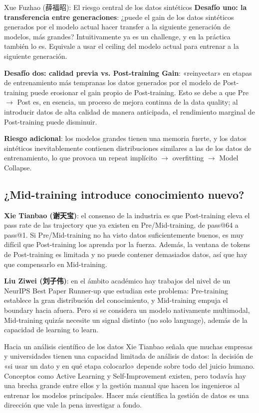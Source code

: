 \documentclass[a4paper]{article}
\begin{document}
\begin{warningbox}{Xue Fuzhao (薛福昭): El riesgo central de los datos sintéticos}
\textbf{Desafío uno: la transferencia entre generaciones}: ¿puede el gain de los datos sintéticos generados por el modelo actual hacer transfer a la siguiente generación de modelos, más grandes? Intuitivamente ya es un challenge, y en la práctica también lo es. Equivale a usar el ceiling del modelo actual para entrenar a la siguiente generación.

\textbf{Desafío dos: calidad previa vs. Post-training Gain}: «reinyectar» en etapas de entrenamiento más tempranas los datos generados por el modelo de Post-training puede erosionar el gain propio de Post-training. Esto se debe a que Pre $\to$ Post es, en esencia, un proceso de mejora continua de la data quality; al introducir datos de alta calidad de manera anticipada, el rendimiento marginal de Post-training puede disminuir.

\textbf{Riesgo adicional}: los modelos grandes tienen una memoria fuerte, y los datos sintéticos inevitablemente contienen distribuciones similares a las de los datos de entrenamiento, lo que provoca un repeat implícito $\to$ overfitting $\to$ Model Collapse.
\end{warningbox}

\subsection{¿Mid-training introduce conocimiento nuevo?}

\textbf{Xie Tianbao (谢天宝)}: el consenso de la industria es que Post-training eleva el pass rate de las trajectory que ya existen en Pre/Mid-training, de pass@64 a pass@1. Si Pre/Mid-training no ha visto datos suficientemente buenos, es muy difícil que Post-training los aprenda por la fuerza. Además, la ventana de tokens de Post-training es limitada y no puede contener demasiados datos, así que hay que compensarlo en Mid-training.

\textbf{Liu Ziwei (刘子伟)}: en el ámbito académico hay trabajos del nivel de un NeurIPS Best Paper Runner-up que estudian este problema: Pre-training establece la gran distribución del conocimiento, y Mid-training empuja el boundary hacia afuera. Pero si se considera un modelo nativamente multimodal, Mid-training quizás necesite un signal distinto (no solo language), además de la capacidad de learning to learn.

\begin{knowledgebox}{Hacia un análisis científico de los datos}
Xie Tianbao señala que muchas empresas y universidades tienen una capacidad limitada de análisis de datos: la decisión de «si usar un dato y en qué etapa colocarlo» depende sobre todo del juicio humano. Conceptos como Active Learning y Self-Improvement existen, pero todavía hay una brecha grande entre ellos y la gestión manual que hacen los ingenieros al entrenar los modelos principales. Hacer más científica la gestión de datos es una dirección que vale la pena investigar a fondo.
\end{knowledgebox}
\end{document}
